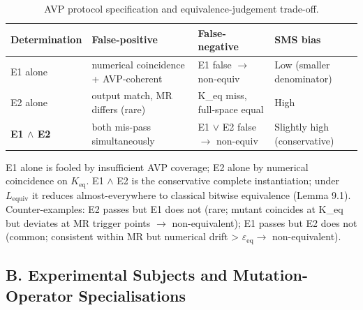\documentclass[review,12pt,authoryear]{elsarticle}
\begin{document}
{\def\LTcaptype{table} %
\begin{longtable}[]{@{}
  >{\raggedright\arraybackslash}p{}
  >{\raggedright\arraybackslash}p{}
  >{\raggedright\arraybackslash}p{}
  >{\raggedright\arraybackslash}p{}@{}}
\caption{AVP protocol specification and equivalence-judgement trade-off.}\label{tab:p2-16}\\
\toprule\noalign{}
\begin{minipage}[b]{\linewidth}\raggedright
Determination
\end{minipage} & \begin{minipage}[b]{\linewidth}\raggedright
False-positive
\end{minipage} & \begin{minipage}[b]{\linewidth}\raggedright
False-negative
\end{minipage} & \begin{minipage}[b]{\linewidth}\raggedright
SMS bias
\end{minipage} \\
\midrule\noalign{}
\endfirsthead
\endhead
\bottomrule\noalign{}
\endlastfoot
E1 alone & numerical coincidence + AVP-coherent & E1 false $\to$ non-equiv &
Low (smaller denominator) \\
E2 alone & output match, MR differs (rare) & K\_eq miss, full-space
equal & High \\
\textbf{E1 $\wedge$ E2} & both mis-pass simultaneously & E1 $\vee$ E2 false $\to$ non-equiv
& Slightly high (conservative) \\
\end{longtable}
}

E1 alone is fooled by insufficient AVP coverage; E2 alone by numerical
coincidence on $K_{\mathrm{eq}}$. E1 $\wedge$ E2 is the conservative complete
instantiation; under $L_{\mathrm{equiv}}$ it reduces almost-everywhere to
classical bitwise equivalence (Lemma 9.1). Counter-examples: E2 passes
but E1 does not (rare; mutant coincides at K\_eq but deviates at MR
trigger points $\to$ non-equivalent); E1 passes but E2 does not (common;
consistent within MR but numerical drift \textgreater{} $\varepsilon_{\mathrm{eq}} \to$
non-equivalent).


\subsection{B. Experimental Subjects and Mutation-Operator Specialisations}\label{b.-experimental-subjects-and-mutation-operator-specialisations}
\end{document}
